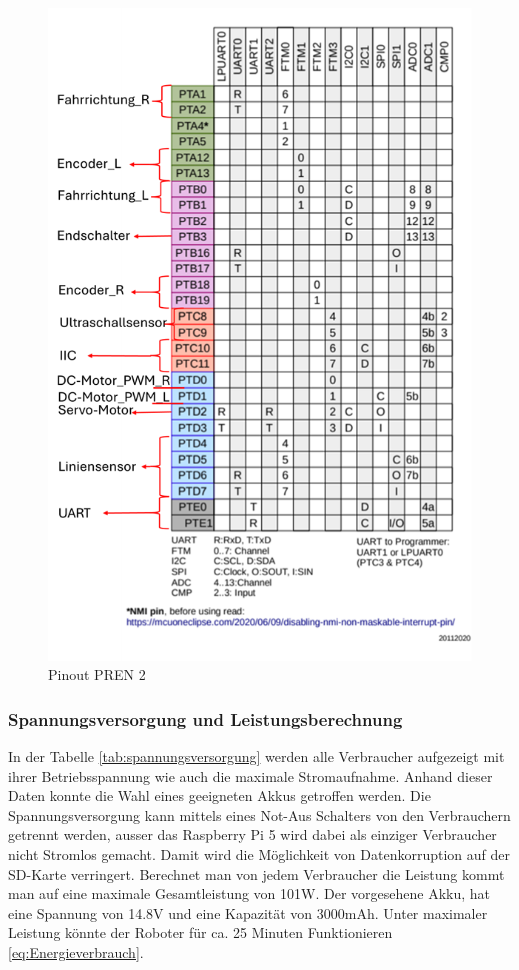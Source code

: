 \begin{figure}[H]
\begin{minipage}[b]{0.45\textwidth}
  \includegraphics[width=\textwidth]{assets/ET/PINOUT/Pinout_PREN2.png}
  \caption{Pinout PREN 2}
  \label{fig:Pinout PREN 2}
\end{minipage}
\end{figure}





\subsubsection{Spannungsversorgung und Leistungsberechnung}


In der Tabelle \ref{tab:spannungsversorgung} werden alle Verbraucher aufgezeigt mit ihrer Betriebsspannung wie auch die maximale Stromaufnahme. Anhand dieser Daten konnte die Wahl eines geeigneten Akkus getroffen werden. Die Spannungsversorgung kann mittels eines Not-Aus Schalters von den Verbrauchern getrennt werden, ausser das Raspberry Pi 5 wird dabei als einziger Verbraucher nicht Stromlos gemacht. Damit wird die Möglichkeit von Datenkorruption auf der SD-Karte verringert. Berechnet man von jedem Verbraucher die Leistung kommt man auf eine maximale Gesamtleistung von 101W. Der vorgesehene Akku, hat eine Spannung von 14.8V und eine Kapazität von 3000mAh. Unter maximaler Leistung könnte der Roboter für ca. 25 Minuten Funktionieren \ref{eq:Energieverbrauch}.

